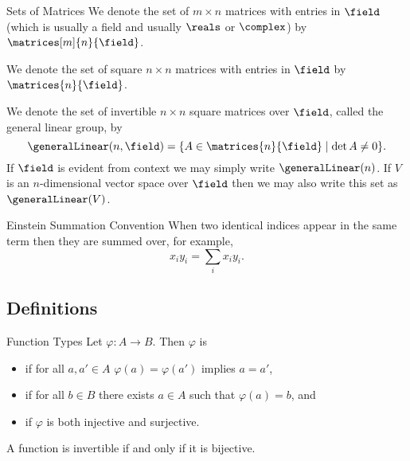 \begin{ntn}{Sets of Matrices}{}
    We denote the set of \(m \times n\) matrices with entries in \(\field\) (which is usually a field and usually \(\reals\) or \(\complex\)) by \(\matrices[m]{n}{\field}\).
    
    We denote the set of square \(n \times n\) matrices with entries in \(\field\) by \(\matrices{n}{\field}\).
    
    We denote the set of invertible \(n\times n\) square matrices over \(\field\), called the general linear group, by
    \begin{equation}
        \generalLinear(n, \field) = \{A \in \matrices{n}{\field} \mid \det A \ne 0\}.
    \end{equation}
    If \(\field\) is evident from context we may simply write \(\generalLinear(n)\).
    If \(V\) is an \(n\)-dimensional vector space over \(\field\) then we may also write this set as \(\generalLinear(V)\).
\end{ntn}

\begin{ntn}{Einstein Summation Convention}{}
    When two identical indices appear in the same term then they are summed over, for example,
    \begin{equation}
        x_iy_i = \sum_{i} x_iy_i.
    \end{equation} 
\end{ntn}

\subsection{Definitions}
\begin{dfn}{Function Types}{}
    Let \(\varphi \colon A \to B\).
    Then \(\varphi\) is 
    \begin{itemize}
        \item {} if for all \(a, a' \in A\) \(\varphi(a) = \varphi(a')\) implies \(a = a'\),
        \item {} if for all \(b \in B\) there exists \(a \in A\) such that \(\varphi(a) = b\), and
        \item {} if \(\varphi\) is both injective and surjective.
    \end{itemize}
    A function is invertible if and only if it is bijective.
\end{dfn}

